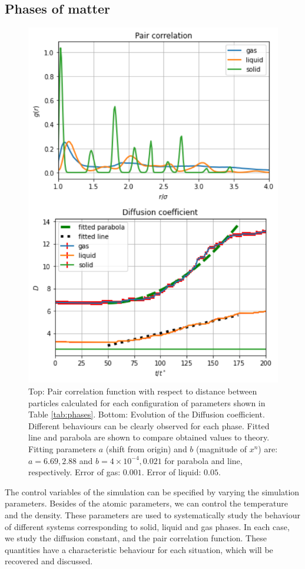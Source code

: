 \documentclass[pra,aps,superscriptaddress,amssymb,amsmath,reprint,noeprint,floatfix]{revtex4-2}
\begin{document}
\subsection{\label{subsec: Phases of matter}Phases of matter}

\begin{figure}[h!]
\centering
\includegraphics[width=0.85\linewidth]{images/phases.pdf}
\caption{Top: Pair correlation function with respect to distance between particles calculated for each configuration of parameters shown in Table \ref{tab:phases}. Bottom: Evolution of the Diffusion coefficient. Different behaviours can be clearly observed for each phase. Fitted line and parabola are shown to compare obtained values to theory. Fitting parameters $a$ (shift from origin) and $b$ (magnitude of $x^n$) are: $a=6.69,2.88$ and $b=4\times10^{-4},0.021$ for parabola and line, respectively. Error of gas: $0.001$. Error of liquid: $0.05$.}
\label{fig:phases}
\end{figure}
The control variables of the simulation can be specified by varying the simulation parameters. Besides of the atomic parameters, we can control the temperature and the density. These parameters are used to systematically study the behaviour of different systems corresponding to solid, liquid and gas phases. In each case, we study the diffusion constant, and the pair correlation function. These quantities have a characteristic behaviour for each situation, which will be recovered and discussed.
\end{document}
